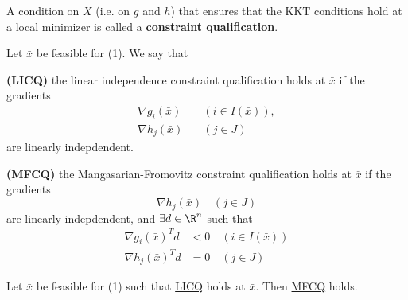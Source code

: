 \label{e8fa554}

A condition on $X$ (i.e. on $g$ and $h$) that ensures that the KKT conditions
hold at a local minimizer is called a \textbf{constraint qualification}.

\label{fed784a}

Let $\bar x$ be feasible for (1). We say that
\begin{enumerata}
  \item \textbf{(LICQ)} the linear independence constraint
  qualification holds at $\bar x$ if the gradients
  \begin{align*}
    \nabla g_i(\bar x) & \quad(i\in I(\bar x)), \\
    \nabla h_j(\bar x) & \quad(j\in J)
  \end{align*}
  are linearly indepdendent.
  \item \textbf{(MFCQ)} the Mangasarian-Fromovitz constraint
  qualification holds at $\bar x$ if the gradients
  $$
    \nabla h_j(\bar x)\quad(j\in J)
  $$
  are linearly indepdendent, and $\exists d\in\R^n$ such that
  \begin{align*}
    \nabla g_i(\bar x)^Td & <0\quad(i\in I(\bar x)) \\
    \nabla h_j(\bar x)^Td & =0\quad(j\in J)
  \end{align*}
\end{enumerata}

\label{a7ef3f5}

Let $\bar x$ be feasible for (1) such that \href{fed784a}{LICQ} holds at $\bar
x$. Then \href{fed784a}{MFCQ} holds.




